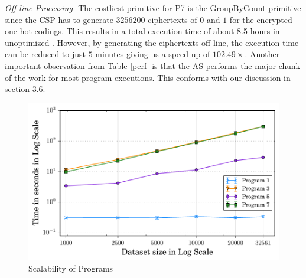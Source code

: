 \textit{Off-line Processing}-
The costliest primitive for P7 is the \textsf{GroupByCount} primitive since the \textsf{CSP} has to generate $3256200$ ciphertexts of $0$ and $1$ for the encrypted one-hot-codings. This results in a  total execution time of about 8.5 hours in unoptimized \system. However, by generating the ciphertexts off-line, the execution time can be reduced to just $5$ minutes giving us a speed up of $102.49\times$.
Another important observation from Table \ref{perf} is that the \textsf{AS} performs the major chunk of the work for most program executions. This conforms with our discussion in section 3.6.
 \begin{figure}[ht]
    
     \includegraphics[width=0.5\linewidth]{scale_finals.pdf}
        \caption{Scalability of \system Programs }\label{scale}
    \end{figure}
